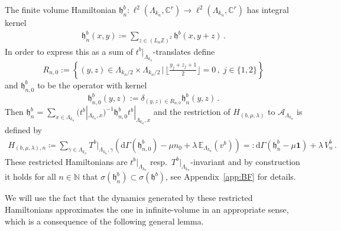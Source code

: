 \documentclass[a4paper]{article}
\newcommand{\E}{\mathbb{E}}
\newcommand{\fd}{r}
\newcommand{\La}{\Lambda}
\newcommand{\N}{\mathbb{N}}
\newcommand{\Z}{\mathbb{Z}}
\newcommand{\C}{\mathbb{C}}
\newcommand{\mA}{\mathcal{A}}
\theoremstyle{plain}
\theoremstyle{definition}
\theoremstyle{remark}
\renewcommand{\(}{\left(}
\renewcommand{\)}{\right)}
\begin{document}
The finite volume Hamiltonian $\mathfrak{h}_{ n}^b \colon \ell^2(\Lambda_{k_n},\C^\fd) \to \ell^2(\Lambda_{k_n},\C^\fd)$ has integral kernel 
    \begin{align*}
\mathfrak{h}_{n}^b(x,y) \coloneq 
    \sum_{z\in(L_n\Z)^2 }
    \mathfrak{h}^b(x,y+z) \,.
    \end{align*}
In order to express this   as a sum of $t^b|_{\La_{k_n}}$-translates 
    define 
    \[
    R_{n,0} :=\left\{(y,z)\in \La_{k_n/2}\times\La_{k_n/2}\,|\,\lfloor \tfrac{y_j+z_j+1}{2} \rfloor =0\,,\;j\in\{1,2\}\right\}
    \]and $\mathfrak{h}^b_{n,0}$ to be the operator with kernel
\[
\mathfrak{h}^b_{n,0}(y,z) := \delta_{(y,z)\in R_{n,0}} \mathfrak{h}^b_n(y,z)\,.
\]
Then $\mathfrak{h}^b_n = \sum_{x\in\La_{k_n}}(t^b|_{\La_{k_n},x})^{-1}\mathfrak{h}^b_{n,0}t^b|_{\La_{k_n},x}$ 
and the restriction of  $H_{(b,\mu,\lambda)} $ to $\mA_{\La_{k_n}}$ is defined by
    \begin{align*}
H_{(b,\mu,\lambda),n}  \coloneq \sum_{\gamma\in\Lambda_{k_n}} T^b|_{\Lambda_{k_n}, \gamma}  \left( \mathrm{d}\Gamma(\mathfrak{h}^b_{n,0}) - \mu n_0 +  \lambda\,\E_{\Lambda_{k_n}}(v^b) \right)=:\mathrm{d}\Gamma(\mathfrak{h}^b_n - \mu \mathbf{1}) + \lambda \,V^b_n \,.
    \end{align*}
These restricted Hamiltonians are $t^b|_{\Lambda_{k_n}}$ resp.\ $T^b|_{\Lambda_{k_n}}$-invariant and by construction it holds for all $n\in\N$ that $\sigma(\mathfrak{h}^b_n) \subset \sigma(\mathfrak{h}^b) $, see Appendix~\ref{app:BF} for details. 

We will use the fact that the dynamics generated by these restricted Hamiltonians approximates the one in infinite-volume in an appropriate sense, which is a consequence of the following general lemma.
\end{document}
